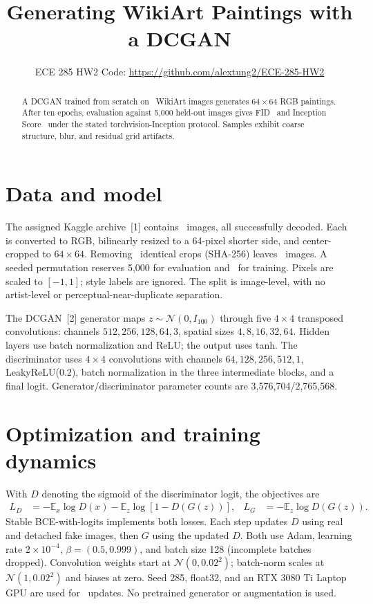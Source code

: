 \documentclass{article}
\title{Generating WikiArt Paintings with a DCGAN}
\author{ECE 285 HW2 \quad Code: \url{https://github.com/alextung2/ECE-285-HW2}}
\begin{document}
\maketitle
\begin{abstract}
A DCGAN trained from scratch on \TrainCount\ WikiArt images generates
$64\times64$ RGB paintings. After ten epochs, evaluation against 5,000
held-out images gives FID \FinalFID\ and Inception Score \FinalIS\ under
the stated torchvision-Inception protocol. Samples exhibit coarse structure,
blur, and residual grid artifacts.
\end{abstract}

\section{Data and model}
The assigned Kaggle archive~[1] contains \RawCount\ images, all successfully
decoded. Each is converted to RGB, bilinearly resized to a 64-pixel shorter
side, and center-cropped to $64\times64$. Removing \DuplicateCount\ identical
crops (SHA-256) leaves \UniqueCount\ images. A seeded permutation reserves
5,000 for evaluation and \TrainCount\ for training. Pixels are scaled to
$[-1,1]$; style labels are ignored. The split is image-level, with no
artist-level or perceptual-near-duplicate separation.

The DCGAN~[2] generator maps $z\sim\mathcal N(0,I_{100})$ through five
$4\times4$ transposed convolutions: channels $512,256,128,64,3$, spatial sizes
$4,8,16,32,64$. Hidden layers use batch normalization and ReLU; the output
uses tanh. The discriminator uses $4\times4$ convolutions with channels
$64,128,256,512,1$, LeakyReLU($0.2$), batch normalization in the three
intermediate blocks, and a final logit. Generator/discriminator parameter
counts are 3,576,704/2,765,568.

\section{Optimization and training dynamics}
With $D$ denoting the sigmoid of the discriminator logit, the objectives are
\begin{align*}
L_D&=-\mathbb E_x\log D(x)-\mathbb E_z\log[1-D(G(z))],&
L_G&=-\mathbb E_z\log D(G(z)).
\end{align*}
\noindent Stable BCE-with-logits implements both losses. Each step updates $D$
using real and detached fake images, then $G$ using the updated $D$.
Both use Adam, learning rate $2\times10^{-4}$, $\beta=(0.5,0.999)$, and batch
size 128 (incomplete batches dropped). Convolution weights start at
$\mathcal N(0,0.02^2)$; batch-norm scales at $\mathcal N(1,0.02^2)$ and biases
at zero. Seed 285, float32, and an RTX 3080 Ti Laptop GPU are used for
\StepCount\ updates. No pretrained generator or augmentation is used.
\end{document}
